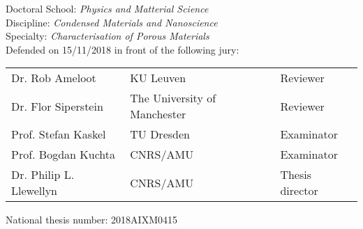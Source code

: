 \begin{titlepage}
\begin{flushleft}
	\vspace{0.2cm}
	\normalsize 
	Doctoral School: \textit{Physics and Matterial Science}\\
	Discipline: \textit{Condensed Materials and Nanoscience}\\
	Specialty: \textit{Characterisation of Porous Materials}\\
	\vspace{0.5cm}
    \normalsize Defended on 15/11/2018 in front of the following jury:\\
\end{flushleft}
\vspace{0.3cm}
\begin{tabular}{lll}
	Dr. Rob Ameloot & KU Leuven & Reviewer \\
    \vspace{0.08cm}
	Dr. Flor Siperstein & The University of Manchester & Reviewer \\
    \vspace{0.08cm}
	Prof. Stefan Kaskel & TU Dresden & Examinator \\
    \vspace{0.08cm}
	Prof. Bogdan Kuchta & CNRS/AMU & Examinator \\
    \vspace{0.08cm}
	Dr. Philip L. Llewellyn & CNRS/AMU & Thesis director \\
\end{tabular}
\begin{flushleft}\normalsize National thesis number: 2018AIXM0415\\\end{flushleft}

\end{titlepage}